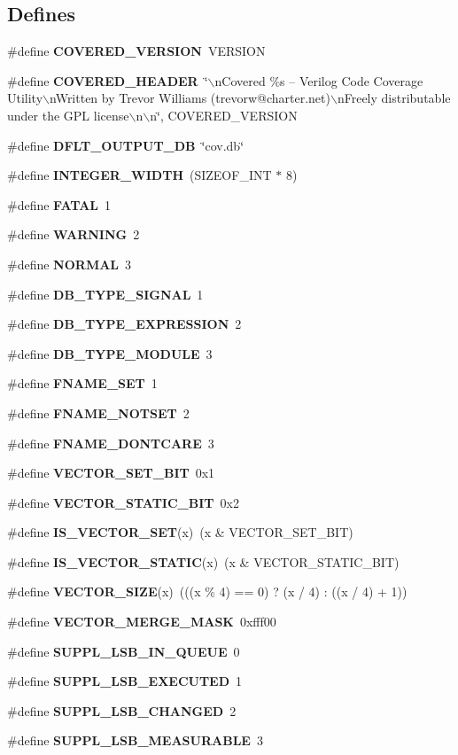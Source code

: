 \subsection*{Defines}
\begin{CompactItemize}
\item 
\#define {\bf COVERED\_\-VERSION}\ VERSION
\item 
\#define {\bf COVERED\_\-HEADER}\ \char`\"{}$\backslash$n\-Covered \%s -- Verilog Code Coverage Utility$\backslash$n\-Written by Trevor Williams  (trevorw@charter.net)$\backslash$n\-Freely distributable under the GPL license$\backslash$n$\backslash$n\char`\"{}, COVERED\_\-VERSION
\item 
\#define {\bf DFLT\_\-OUTPUT\_\-DB}\ \char`\"{}cov.db\char`\"{}
\item 
\#define {\bf INTEGER\_\-WIDTH}\ (SIZEOF\_\-INT $\ast$ 8)
\item 
\#define {\bf FATAL}\ 1
\item 
\#define {\bf WARNING}\ 2
\item 
\#define {\bf NORMAL}\ 3
\item 
\#define {\bf DB\_\-TYPE\_\-SIGNAL}\ 1
\item 
\#define {\bf DB\_\-TYPE\_\-EXPRESSION}\ 2
\item 
\#define {\bf DB\_\-TYPE\_\-MODULE}\ 3
\item 
\#define {\bf FNAME\_\-SET}\ 1
\item 
\#define {\bf FNAME\_\-NOTSET}\ 2
\item 
\#define {\bf FNAME\_\-DONTCARE}\ 3
\item 
\#define {\bf VECTOR\_\-SET\_\-BIT}\ 0x1
\item 
\#define {\bf VECTOR\_\-STATIC\_\-BIT}\ 0x2
\item 
\#define {\bf IS\_\-VECTOR\_\-SET}(x)\ (x \& VECTOR\_\-SET\_\-BIT)
\item 
\#define {\bf IS\_\-VECTOR\_\-STATIC}(x)\ (x \& VECTOR\_\-STATIC\_\-BIT)
\item 
\#define {\bf VECTOR\_\-SIZE}(x)\ (((x \% 4) == 0) ? (x / 4) : ((x / 4) + 1))
\item 
\#define {\bf VECTOR\_\-MERGE\_\-MASK}\ 0xfff00
\item 
\#define {\bf SUPPL\_\-LSB\_\-IN\_\-QUEUE}\ 0
\item 
\#define {\bf SUPPL\_\-LSB\_\-EXECUTED}\ 1
\item 
\#define {\bf SUPPL\_\-LSB\_\-CHANGED}\ 2
\item 
\#define {\bf SUPPL\_\-LSB\_\-MEASURABLE}\ 3
\item 

\end{CompactItemize}

